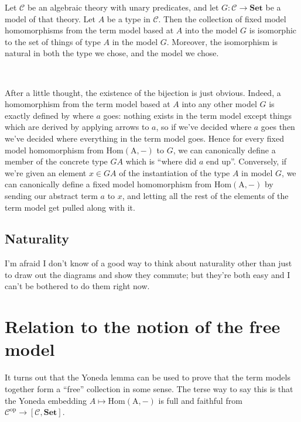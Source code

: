\documentclass[11pt]{amsart}
\newcommand{\homfrom}[1]{\mathrm{Hom\left(#1, -\right)}}
\newcommand{\Set}{\mathbf{Set}}
\begin{document}
    \begin{thm}
        Let $\mathcal{C}$ be an algebraic theory with unary predicates, and let $G: \mathcal{C} \to \Set$ be a model of that theory.
        Let $A$ be a type in $\mathcal{C}$.
        Then the collection of fixed model homomorphisms from the term model based at $A$ into the model $G$ is isomorphic to the set of things of type $A$ in the model $G$.
        Moreover, the isomorphism is natural in both the type we chose, and the model we chose.
    \end{thm}

    \

    After a little thought, the existence of the bijection is just obvious.
    Indeed, a homomorphism from the term model based at $A$ into any other model $G$ is exactly defined by where $a$ goes: nothing exists in the term model except things which are derived by applying arrows to $a$,
    so if we've decided where $a$ goes then we've decided where everything in the term model goes.
    Hence for every fixed model homomorphism from $\homfrom{A}$ to $G$, we can canonically define a member of the concrete type $GA$ which is ``where did $a$ end up''.
    Conversely, if we're given an element $x \in GA$ of the instantiation of the type $A$ in model $G$, we can canonically define a fixed model homomorphism from $\homfrom{A}$ by sending our abstract term $a$ to $x$, and letting all the rest of the elements of the term model get pulled along with it.

    \subsection{Naturality}

I'm afraid I don't know of a good way to think about naturality other than just to draw out the diagrams and show they commute; but they're both easy and I can't be bothered to do them right now.

    \section{Relation to the notion of the free model}

    It turns out that the Yoneda lemma can be used to prove that the term models together form a ``free'' collection in some sense.
    The terse way to say this is that the Yoneda embedding $A \mapsto \homfrom{A}$ is full and faithful from $\mathcal{C}^{\mathrm{op}} \to [\mathcal{C}, \Set]$.
\end{document}
